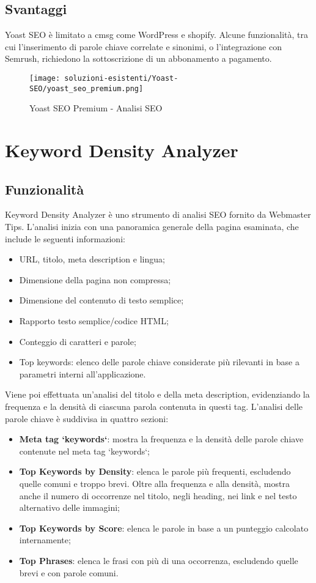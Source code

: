 \subsection{Svantaggi}
\par Yoast SEO è limitato a \gls{cmsg} come WordPress e \gls{shopify}. Alcune funzionalità, tra cui l'inserimento di parole chiave correlate e sinonimi, o l'integrazione con Semrush, richiedono la sottoscrizione di un abbonamento a pagamento.

\begin{figure}[H]
    \centering 
    \texttt{[image: soluzioni-esistenti/Yoast-SEO/yoast\_seo\_premium.png]} 
    \caption{Yoast SEO Premium - Analisi SEO}
\end{figure}

\section{Keyword Density Analyzer}

\subsection{Funzionalità}
\par Keyword Density Analyzer è uno strumento di analisi SEO fornito da Webmaster Tips. L'analisi inizia con una panoramica generale della pagina esaminata, che include le seguenti informazioni:
\begin{itemize}
    \item URL, titolo, meta description e lingua;
    \item Dimensione della pagina non compressa;
    \item Dimensione del contenuto di testo semplice;
    \item Rapporto testo semplice/codice HTML;
    \item Conteggio di caratteri e parole;
    \item Top keywords: elenco delle parole chiave considerate più rilevanti in base a parametri interni all'applicazione.
\end{itemize}
Viene poi effettuata un'analisi del titolo e della meta description, evidenziando la frequenza e la densità di ciascuna parola contenuta in questi tag. L'analisi delle parole chiave è suddivisa in quattro sezioni:
\begin{itemize}
    \item \textbf{Meta tag `keywords`}: mostra la frequenza e la densità delle parole chiave contenute nel meta tag `keywords`;
    \item \textbf{Top Keywords by Density}: elenca le parole più frequenti, escludendo quelle comuni e troppo brevi. Oltre alla frequenza e alla densità, mostra anche il numero di occorrenze nel titolo, negli heading, nei link e nel testo alternativo delle immagini;
    \item \textbf{Top Keywords by Score}: elenca le parole in base a un punteggio calcolato internamente;
    \item \textbf{Top Phrases}: elenca le frasi con più di una occorrenza, escludendo quelle brevi e con parole comuni.
\end{itemize}

